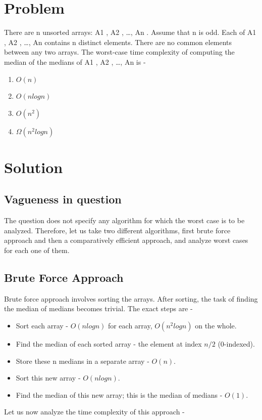 \documentclass[journal,12pt,twocolumn]{IEEEtran}
\begin{document}
\section{Problem}
There are n unsorted arrays: A1 , A2 , …, An . Assume that n is odd. Each of A1 , A2 , …, An
contains n distinct elements. There are no common elements between any two arrays. The
worst-case time complexity of computing the median of the medians of A1 , A2 , …, An is -

\begin{enumerate}
    \item $O(n)$
    \item $O(nlogn)$
    \item  $O(n^{2})$
    \item $\Omega(n^{2}log n)$
\end{enumerate}



\section{Solution}
\subsection{Vagueness in question}
The question does not specify any algorithm for which the worst case is to be analyzed. Therefore, let us take two different algorithms, first brute force approach and then a comparatively efficient approach, and analyze worst cases for each one of them.


\subsection{Brute Force Approach}

Brute force approach involves sorting the arrays. After sorting, the task of finding the median of medians becomes trivial.
The exact steps are - 
\begin{itemize}
    \item Sort each array - $O(nlogn)$ for each array, $O(n^{2}logn)$ on the whole.
    \item Find the median of each sorted array - the element at  index $n/2$ (0-indexed).
    \item Store these n medians in a separate array - $O(n)$.
    \item Sort this new array - $O(nlogn)$.
    \item Find the median of this new array; this is the median of medians - $O(1)$.
\end{itemize}
Let us now analyze the time complexity of this approach - 
\newline
\end{document}
